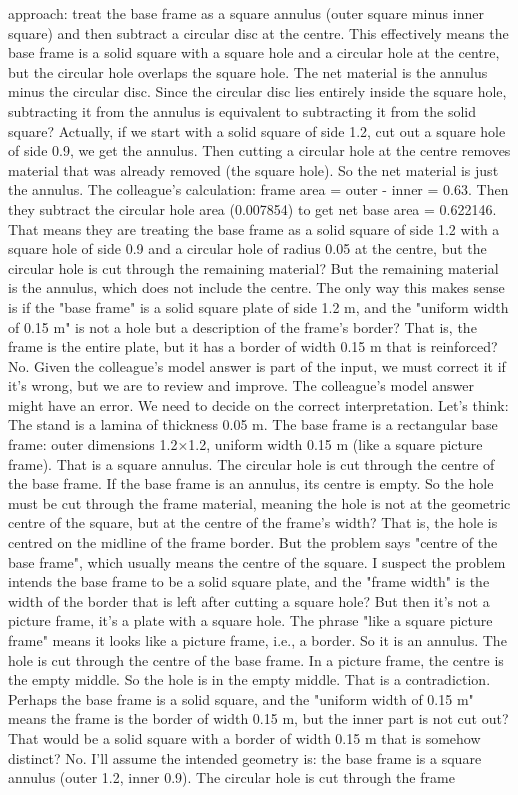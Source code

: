 \documentclass[11pt]{article}
\begin{document}
\begin{exoresolu}
\begin{enumerate}
\begin{itemize}
approach: treat the base frame as a square annulus (outer square minus inner square) and then subtract a circular disc at the centre. This effectively means the base frame is a solid square with a square hole and a circular hole at the centre, but the circular hole overlaps the square hole. The net material is the annulus minus the circular disc. Since the circular disc lies entirely inside the square hole, subtracting it from the annulus is equivalent to subtracting it from the solid square? Actually, if we start with a solid square of side 1.2, cut out a square hole of side 0.9, we get the annulus. Then cutting a circular hole at the centre removes material that was already removed (the square hole). So the net material is just the annulus. The colleague's calculation: frame area = outer - inner = 0.63. Then they subtract the circular hole area (0.007854) to get net base area = 0.622146. That means they are treating the base frame as a solid square of side 1.2 with a square hole of side 0.9 and a circular hole of radius 0.05 at the centre, but the circular hole is cut through the remaining material? But the remaining material is the annulus, which does not include the centre. The only way this makes sense is if the "base frame" is a solid square plate of side 1.2 m, and the "uniform width of 0.15 m" is not a hole but a description of the frame's border? That is, the frame is the entire plate, but it has a border of width 0.15 m that is reinforced? No. Given the colleague's model answer is part of the input, we must correct it if it's wrong, but we are to review and improve. The colleague's model answer might have an error. We need to decide on the correct interpretation. Let's think: The stand is a lamina of thickness 0.05 m. The base frame is a rectangular base frame: outer dimensions 1.2×1.2, uniform width 0.15 m (like a square picture frame). That is a square annulus. The circular hole is cut through the centre of the base frame. If the base frame is an annulus, its centre is empty. So the hole must be cut through the frame material, meaning the hole is not at the geometric centre of the square, but at the centre of the frame's width? That is, the hole is centred on the midline of the frame border. But the problem says "centre of the base frame", which usually means the centre of the square. I suspect the problem intends the base frame to be a solid square plate, and the "frame width" is the width of the border that is left after cutting a square hole? But then it's not a picture frame, it's a plate with a square hole. The phrase "like a square picture frame" means it looks like a picture frame, i.e., a border. So it is an annulus. The hole is cut through the centre of the base frame. In a picture frame, the centre is the empty middle. So the hole is in the empty middle. That is a contradiction. Perhaps the base frame is a solid square, and the "uniform width of 0.15 m" means the frame is the border of width 0.15 m, but the inner part is not cut out? That would be a solid square with a border of width 0.15 m that is somehow distinct? No. I'll assume the intended geometry is: the base frame is a square annulus (outer 1.2, inner 0.9). The circular hole is cut through the frame 
\end{itemize}
\end{enumerate}
\end{exoresolu}
\end{document}
